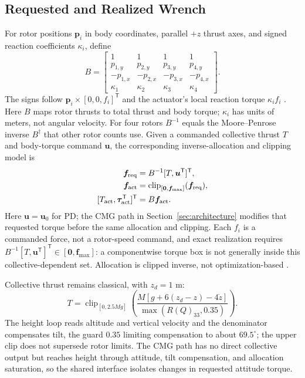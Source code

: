 \documentclass[letterpaper, 10 pt, conference]{ieeeconf}
\newcommand{\T}{^{\mathsf T}}
\newcommand{\clip}{\operatorname{clip}}
\begin{document}
\subsection{Requested and Realized Wrench}
For rotor positions $\bm p_i$ in body coordinates, parallel $+z$ thrust
axes, and signed reaction coefficients $\kappa_i$, define
\begin{equation}
 B=\begin{bmatrix}
 1&1&1&1\\p_{1,y}&p_{2,y}&p_{3,y}&p_{4,y}\\
 -p_{1,x}&-p_{2,x}&-p_{3,x}&-p_{4,x}\\
 \kappa_1&\kappa_2&\kappa_3&\kappa_4
 \end{bmatrix}.
 \label{eq:allocationmatrix}
\end{equation}
The signs follow $\bm p_i\times[0,0,f_i]\T$ and the actuator's local reaction torque $\kappa_i f_i$ \cite{garciacarrillo2013quad}. Here $B$ maps rotor thrusts to total thrust and body torque; $\kappa_i$ has units of meters, not angular velocity. For four rotors $B^{-1}$ equals the Moore--Penrose inverse $B^\dagger$ that other rotor counts use. Given a commanded collective thrust $T$ and body-torque command $\bm u$, the corresponding inverse-allocation and clipping model is
\begin{equation}
 \begin{aligned}
 \bm f_{\rm req}&=B^{-1}[T,\bm u\T]\T,\\
 \bm f_{\rm act}&=\clip_{[\bm0,\bm f_{\max}]}(\bm f_{\rm req}),\\
 [T_{\rm act},\bm\tau_{\rm act}\T]\T&=B\bm f_{\rm act}.
 \end{aligned}
 \label{eq:mixer}
\end{equation}
Here $\bm u=\bm u_0$ for PD; the CMG path in Section~\ref{sec:architecture}
modifies that requested torque before the same allocation and clipping.
Each $f_i$ is a commanded force, not a rotor-speed command, and exact
realization requires $B^{-1}[T,\bm u\T]\T\in[\bm0,\bm f_{\max}]$: a
componentwise torque box is not generally inside this collective-dependent
set. Allocation is clipped inverse, not optimization-based
\cite{monteiro2016allocation}.

Collective thrust remains classical, with $z_d=1$ m:
\begin{equation}
 T=\clip_{[0,2.5Mg]}
 \left(\frac{M[g+6(z_d-z)-4\dot z]}{\max(R(Q)_{33},0.35)}\right).
 \label{eq:collective}
\end{equation}
The height loop reads altitude and vertical velocity and the denominator
compensates tilt, the guard $0.35$ limiting compensation to about
$69.5^\circ$; the upper clip does not supersede rotor limits. The CMG path
has no direct collective output but reaches height through attitude, tilt
compensation, and allocation saturation, so the shared interface isolates
changes in requested attitude torque.
\end{document}
